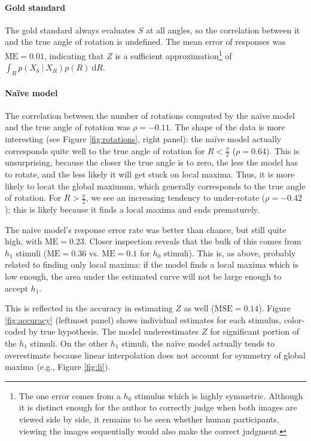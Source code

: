 \documentclass{article} %
\newcommand{\MSE}[0]{\mathrm{MSE}}
\newcommand{\ME}[0]{\mathrm{ME}}
\newcommand{\naive}[0]{na\"ive}
\newcommand{\Naive}[0]{Na\"ive}
\begin{document}
\paragraph{Gold standard} 

The gold standard always evaluates $S$ at all angles, so the
correlation between it and the true angle of rotation is
undefined. The mean error of responses was $\ME{}=0.01$, indicating
that $Z$ is a sufficient approximation\footnote{The one error comes
  from a $h_0$ stimulus which is highly symmetric. Although it is
  distinct enough for the author to correctly judge when both images
  are viewed side by side, it remains to be seen whether human
  participants, viewing the images sequentially would also make the
  correct judgment.}  of $\int_R p(X_b\ \vert\ X_R)p(R)\ \mathrm{d}R$.

\paragraph{\Naive{} model} 

The correlation between the number of rotations computed by the
\naive{} model and the true angle of rotation was $\rho=-0.11$. The
shape of the data is more interesting (see Figure \ref{fig:rotations},
right panel): the \naive{} model actually corresponds quite well to
the true angle of rotation for $R<\frac{\pi}{2}$ ($\rho=0.64$). This
is unsurprising, because the closer the true angle is to zero, the
less the model has to rotate, and the less likely it will get stuck on
local maxima. Thus, it is more likely to locat the global maximum,
which generally corresponds to the true angle of rotation. For
$R>\frac{\pi}{2}$, we see an increasing tendency to under-rotate
($\rho=-0.42$); this is likely because it finds a local maxima and
ends prematurely.

The \naive{} model's response error rate was better than chance, but
still quite high, with $\ME{}=0.23$. Closer inspection reveals that
the bulk of this comes from $h_1$ stimuli ($\ME{}=0.36$
vs. $\ME{}=0.1$ for $h_0$ stimuli). This is, as above, probably
related to finding only local maxima: if the model finds a local
maxima which is low enough, the area under the estimated curve will
not be large enough to accept $h_1$.

This is reflected in the accuracy in estimating $Z$ as well
($\MSE{}=0.14$). Figure \ref{fig:accuracy} (leftmost panel) shows
individual estimates for each stimulus, color-coded by true
hypothesis. The model underestimates $Z$ for significant portion of
the $h_1$ stimuli. On the other $h_1$ stimuli, the \naive{} model
actually tends to overestimate because linear interpolation does not
account for symmetry of global maxima (e.g., Figure \ref{fig:li}).
\end{document}
